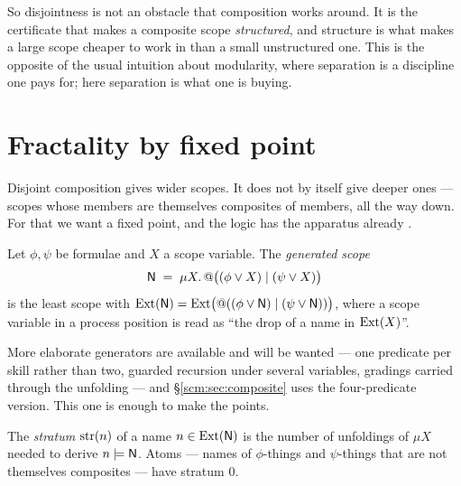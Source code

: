 So disjointness is not an obstacle that composition works around. It is
the certificate that makes a composite scope \emph{structured}, and
structure is what makes a large scope cheaper to work in than a small
unstructured one. This is the opposite of the usual intuition about
modularity, where separation is a discipline one pays for; here separation
is what one is buying.

\section{Fractality by fixed point}

Disjoint composition gives wider scopes. It does not by itself give deeper
ones --- scopes whose members are themselves composites of members, all
the way down. For that we want a fixed point, and the logic has the
apparatus already \cite{kozen}.

\begin{definition}
\label{sco:def:gen}
Let $\phi, \psi$ be formulae and $X$ a scope variable. The
\emph{generated scope}
\[
  \mathsf{N} \;=\; \mu X.\, @\bigl( (\phi \lor X) \mid (\psi \lor X) \bigr)
\]
is the least scope with
$\mathrm{Ext}(\mathsf{N}) = \mathrm{Ext}\bigl(@((\phi \lor \mathsf{N}) \mid (\psi \lor \mathsf{N}))\bigr)$,
where a scope variable in a process position is read as ``the drop of a
name in $\mathrm{Ext}(X)$''.
\end{definition}

More elaborate generators are available and will be wanted --- one
predicate per skill rather than two, guarded recursion under several
variables, gradings carried through the unfolding --- and
\S\ref{scm:sec:composite} uses the four-predicate version. This one is
enough to make the points.

\begin{definition}[Stratum]
\label{sco:def:stratum}
The \emph{stratum} $\mathrm{str}(n)$ of a name $n \in \mathrm{Ext}(\mathsf{N})$ is the number of
unfoldings of $\mu X$ needed to derive $n \models \mathsf{N}$. Atoms --- names of
$\phi$-things and $\psi$-things that are not themselves composites ---
have stratum $0$.
\end{definition}

